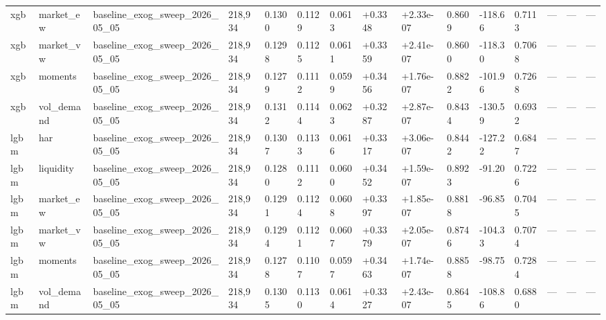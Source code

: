 \begin{table}[t]
\begin{tabular}{lllllllllllllll}
xgb & market\_ew & baseline\_exog\_sweep\_2026\_05\_05 & 218,934 & 0.1300 & 0.1129 & 0.0613 & +0.3348 & +2.33e-07 & 0.8609 & -118.66 & 0.7113 & — & — & — \\
xgb & market\_vw & baseline\_exog\_sweep\_2026\_05\_05 & 218,934 & 0.1298 & 0.1125 & 0.0611 & +0.3359 & +2.41e-07 & 0.8600 & -118.30 & 0.7068 & — & — & — \\
xgb & moments & baseline\_exog\_sweep\_2026\_05\_05 & 218,934 & 0.1279 & 0.1112 & 0.0599 & +0.3456 & +1.76e-07 & 0.8822 & -101.96 & 0.7268 & — & — & — \\
xgb & vol\_demand & baseline\_exog\_sweep\_2026\_05\_05 & 218,934 & 0.1312 & 0.1144 & 0.0623 & +0.3287 & +2.87e-07 & 0.8434 & -130.59 & 0.6932 & — & — & — \\
lgbm & har & baseline\_exog\_sweep\_2026\_05\_05 & 218,934 & 0.1307 & 0.1133 & 0.0616 & +0.3317 & +3.06e-07 & 0.8442 & -127.22 & 0.6847 & — & — & — \\
lgbm & liquidity & baseline\_exog\_sweep\_2026\_05\_05 & 218,934 & 0.1280 & 0.1112 & 0.0600 & +0.3452 & +1.59e-07 & 0.8923 & -91.20 & 0.7226 & — & — & — \\
lgbm & market\_ew & baseline\_exog\_sweep\_2026\_05\_05 & 218,934 & 0.1291 & 0.1124 & 0.0608 & +0.3397 & +1.85e-07 & 0.8818 & -96.85 & 0.7045 & — & — & — \\
lgbm & market\_vw & baseline\_exog\_sweep\_2026\_05\_05 & 218,934 & 0.1294 & 0.1121 & 0.0607 & +0.3379 & +2.05e-07 & 0.8746 & -104.33 & 0.7074 & — & — & — \\
lgbm & moments & baseline\_exog\_sweep\_2026\_05\_05 & 218,934 & 0.1278 & 0.1107 & 0.0597 & +0.3463 & +1.74e-07 & 0.8858 & -98.75 & 0.7284 & — & — & — \\
lgbm & vol\_demand & baseline\_exog\_sweep\_2026\_05\_05 & 218,934 & 0.1305 & 0.1130 & 0.0614 & +0.3327 & +2.43e-07 & 0.8645 & -108.86 & 0.6880 & — & — & — \\
\bottomrule
\end{tabular}
\end{table}
